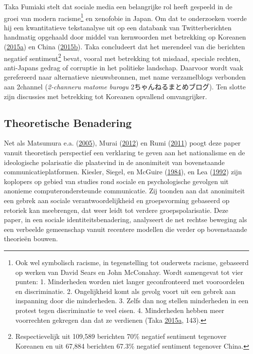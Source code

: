 \documentclass[10.5pt,dutch,]{article}
\begin{document}
Taka Fumiaki stelt dat sociale media een belangrijke rol heeft gespeeld
in de groei van modern racisme\footnote{Ook wel symbolisch racisme, in
  tegenstelling tot ouderwets racisme, gebaseerd op werken van David
  Sears en John McConahay. Wordt samengevat tot vier punten: 1.
  Minderheden worden niet langer geconfronteerd met vooroordelen en
  discriminatie. 2. Ongelijkheid komt als gevolg voort uit een gebrek
  aan inspanning door die minderheden. 3. Zelfs dan nog stellen
  minderheden in een protest tegen discriminatie te veel eisen. 4.
  Minderheden hebben meer voorrechten gekregen dan dat ze verdienen
  (Taka
  \protect\hyperlink{ref-takaux5ftwitterux5f2015-1}{2015}\protect\hyperlink{ref-takaux5ftwitterux5f2015-1}{a},
  143).} en xenofobie in Japan. Om dat te onderzoeken voerde hij een
kwantitatieve tekstanalyse uit op een databank van Twitterberichten
handmatig opgehaald door middel van kernwoorden met betrekking op
Koreanen
(\protect\hyperlink{ref-takaux5ftwitterux5f2015-1}{2015}\protect\hyperlink{ref-takaux5ftwitterux5f2015-1}{a})
en China
(\protect\hyperlink{ref-takaux5ftwitterux5f2015}{2015}\protect\hyperlink{ref-takaux5ftwitterux5f2015}{b}).
Taka concludeert dat het merendeel van die berichten negatief
sentiment\footnote{Respectievelijk uit 109,589 berichten 70\% negatief
  sentiment tegenover Koreanen en uit 67,884 berichten 67.3\% negatief
  sentiment tegenover China.} bevat, vooral met betrekking tot misdaad,
speciale rechten, anti-Japans gedrag of corruptie in het politieke
landschap. Daarvoor wordt vaak gerefereerd naar alternatieve
nieuwsbronnen, met name verzamelblogs verbonden aan 2channel
(\emph{2-channeru matome burogu} 2ちゃんねるまとめブログ). Ten slotte
zijn discussies met betrekking tot Koreanen opvallend omvangrijker.

\subsection{Theoretische Benadering}\label{theoretische-benadering}

Net als Matsumura e.a.
(\protect\hyperlink{ref-matsumuraux5fdynamismux5f2005}{2005}), Murai
(\protect\hyperlink{ref-muraiux5fnetux5f2012}{2012}) en Rumi
(\protect\hyperlink{ref-rumiux5fkoreansux5f2011}{2011}) poogt deze paper
vanuit theoretisch perspectief een verklaring te geven aan het
nationalisme en de ideologische polarisatie die plaatsvind in de
anonimiteit van bovenstaande communicatieplatformen. Kiesler, Siegel, en
McGuire (\protect\hyperlink{ref-kieslerux5fsocialux5f1984}{1984}), en
Lea (\protect\hyperlink{ref-leaux5fsocialux5f1992}{1992}) zijn koplopers
op gebied van studies rond sociale en psychologische gevolgen uit
anonieme computerondersteunde communicatie. Zij toonden aan dat
anonimiteit een gebrek aan sociale verantwoordelijkheid en groepsvorming
gebaseerd op retoriek kan meebrengen, dat weer leidt tot verdere
groepspolarisatie. Deze paper, in een sociale identiteitsbenadering,
analyseert de net rechtse beweging als een verbeelde gemeenschap vanuit
recentere modellen die verder op bovenstaande theorieën bouwen.
\end{document}
